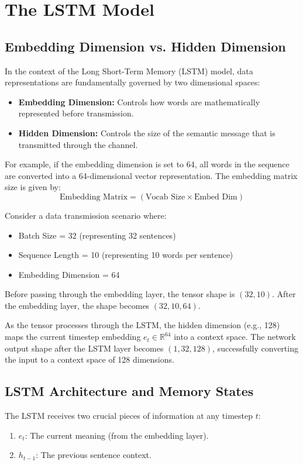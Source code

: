 \documentclass[12pt, a4paper, twocolumn]{article}
\begin{document}
\section{\large \textbf{The LSTM Model}}

\subsection{\textbf{Embedding Dimension vs. Hidden Dimension}}
In the context of the Long Short-Term Memory (LSTM) model, data representations are fundamentally governed by two dimensional spaces:
\begin{itemize}
    \item \textbf{Embedding Dimension:} Controls how words are mathematically represented before transmission. 
    \item \textbf{Hidden Dimension:} Controls the size of the semantic message that is transmitted through the channel.
\end{itemize}

For example, if the embedding dimension is set to 64, all words in the sequence are converted into a 64-dimensional vector representation. The embedding matrix size is given by:
\begin{equation}
    \text{Embedding Matrix} = (\text{Vocab Size} \times \text{Embed Dim})
\end{equation}

Consider a data transmission scenario where:
\begin{itemize}
    \item Batch Size = 32 (representing 32 sentences)
    \item Sequence Length = 10 (representing 10 words per sentence)
    \item Embedding Dimension = 64
\end{itemize}
Before passing through the embedding layer, the tensor shape is $(32, 10)$. After the embedding layer, the shape becomes $(32, 10, 64)$. 

As the tensor processes through the LSTM, the hidden dimension (e.g., 128) maps the current timestep embedding $e_t \in \mathbb{R}^{64}$ into a context space. The network output shape after the LSTM layer becomes $(1, 32, 128)$, successfully converting the input to a context space of 128 dimensions.

\subsection{\textbf{LSTM Architecture and Memory States}}
The LSTM receives two crucial pieces of information at any timestep $t$:
\begin{enumerate}
    \item $e_t$: The current meaning (from the embedding layer).
    \item $h_{t-1}$: The previous sentence context.
\end{enumerate}
\end{document}
